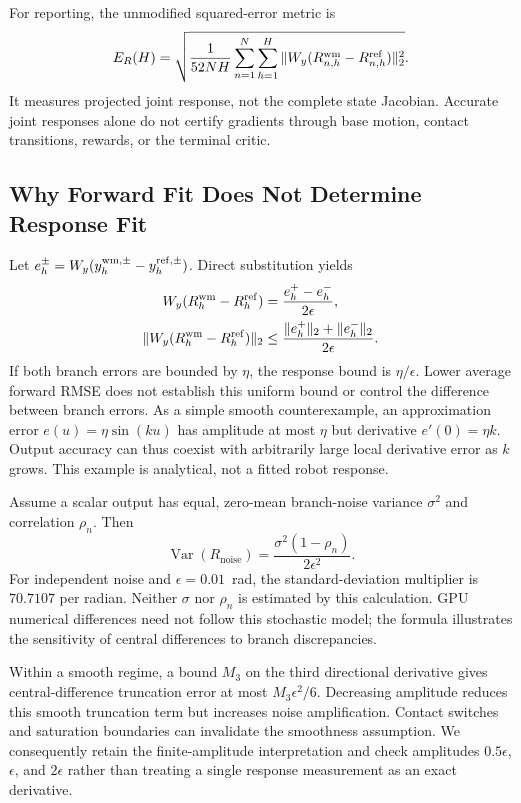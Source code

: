 For reporting, the unmodified squared-error metric is
\begin{equation}
E_R(H)=\sqrt{\frac{1}{52NH}\sum_{n=1}^{N}\sum_{h=1}^{H}
\|W_y(R_{n,h}^{\mathrm{wm}}-R_{n,h}^{\mathrm{ref}})\|_2^2}.
\label{eq:metric}
\end{equation}
It measures projected joint response, not the complete state Jacobian. Accurate joint responses alone do not certify gradients through base motion, contact transitions, rewards, or the terminal critic.

\subsection{Why Forward Fit Does Not Determine Response Fit}
Let $e_h^\pm=W_y(y_h^{\mathrm{wm},\pm}-y_h^{\mathrm{ref},\pm})$. Direct substitution yields
\begin{equation}
\begin{aligned}
W_y(R_h^{\mathrm{wm}}-R_h^{\mathrm{ref}})&=\frac{e_h^+-e_h^-}{2\epsilon},\\
\|W_y(R_h^{\mathrm{wm}}-R_h^{\mathrm{ref}})\|_2
&\le\frac{\|e_h^+\|_2+\|e_h^-\|_2}{2\epsilon}.
\end{aligned}\label{eq:branchbound}
\end{equation}
If both branch errors are bounded by $\eta$, the response bound is $\eta/\epsilon$. Lower average forward RMSE does not establish this uniform bound or control the difference between branch errors. As a simple smooth counterexample, an approximation error $e(u)=\eta\sin(ku)$ has amplitude at most $\eta$ but derivative $e'(0)=\eta k$. Output accuracy can thus coexist with arbitrarily large local derivative error as $k$ grows. This example is analytical, not a fitted robot response.

Assume a scalar output has equal, zero-mean branch-noise variance $\sigma^2$ and correlation $\rho_n$. Then
\begin{equation}
\operatorname{Var}(R_{\mathrm{noise}})
=\frac{\sigma^2(1-\rho_n)}{2\epsilon^2}.
\label{eq:noise}
\end{equation}
For independent noise and $\epsilon=0.01$~rad, the standard-deviation multiplier is $70.7107$ per radian. Neither $\sigma$ nor $\rho_n$ is estimated by this calculation. GPU numerical differences need not follow this stochastic model; the formula illustrates the sensitivity of central differences to branch discrepancies.

Within a smooth regime, a bound $M_3$ on the third directional derivative gives central-difference truncation error at most $M_3\epsilon^2/6$. Decreasing amplitude reduces this smooth truncation term but increases noise amplification. Contact switches and saturation boundaries can invalidate the smoothness assumption. We consequently retain the finite-amplitude interpretation and check amplitudes $0.5\epsilon$, $\epsilon$, and $2\epsilon$ rather than treating a single response measurement as an exact derivative.

